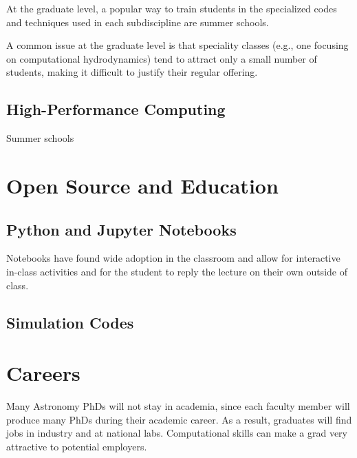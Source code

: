 \documentclass[11pt]{article}
\begin{document}
At the graduate level, a popular way to train students in the specialized
codes and techniques used in each subdiscipline are summer schools.

A common issue at the graduate level is that speciality classes (e.g.,
one focusing on computational hydrodynamics) tend to attract only a
small number of students, making it difficult to justify their regular
offering.

\subsection{High-Performance Computing}

Summer schools


\section{Open Source and Education}

\subsection{Python and Jupyter Notebooks}

Notebooks have found wide adoption in the classroom and allow for
interactive in-class activities and for the student to reply the
lecture on their own outside of class.

\subsection{Simulation Codes}




\section{Careers}

Many Astronomy PhDs will not stay in academia, since each faculty member
will produce many PhDs during their academic career.  As a result, graduates
will find jobs in industry and at national labs.  Computational skills 
can make a grad very attractive to potential employers.
\end{document}
